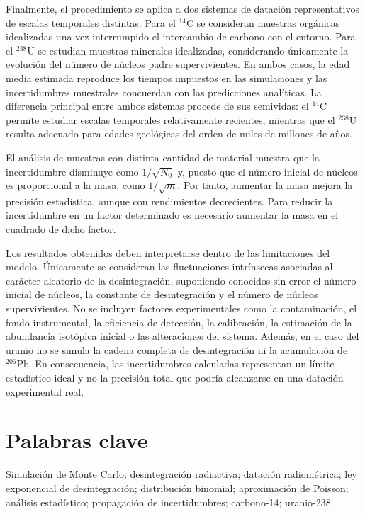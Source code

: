 \documentclass[12pt,a4paper]{article}
\begin{document}
Finalmente, el procedimiento se aplica a dos sistemas de datación representativos de escalas temporales distintas. Para el $^{14}\text{C}$ se consideran muestras orgánicas idealizadas una vez interrumpido el intercambio de carbono con el entorno. Para el $^{238}\text{U}$ se estudian muestras minerales idealizadas, considerando únicamente la evolución del número de núcleos padre supervivientes. En ambos casos, la edad media estimada reproduce los tiempos impuestos en las simulaciones y las incertidumbres muestrales concuerdan con las predicciones analíticas. La diferencia principal entre ambos sistemas procede de sus semividas: el $^{14}\text{C}$ permite estudiar escalas temporales relativamente recientes, mientras que el $^{238}\text{U}$ resulta adecuado para edades geológicas del orden de miles de millones de años.

El análisis de muestras con distinta cantidad de material muestra que la incertidumbre disminuye como $1/\sqrt{N_0}$ y, puesto que el número inicial de núcleos es proporcional a la masa, como $1/\sqrt{m}$. Por tanto, aumentar la masa mejora la precisión estadística, aunque con rendimientos decrecientes. Para reducir la incertidumbre en un factor determinado es necesario aumentar la masa en el cuadrado de dicho factor.

Los resultados obtenidos deben interpretarse dentro de las limitaciones del modelo. Únicamente se consideran las fluctuaciones intrínsecas asociadas al carácter aleatorio de la desintegración, suponiendo conocidos sin error el número inicial de núcleos, la constante de desintegración y el número de núcleos supervivientes. No se incluyen factores experimentales como la contaminación, el fondo instrumental, la eficiencia de detección, la calibración, la estimación de la abundancia isotópica inicial o las alteraciones del sistema. Además, en el caso del uranio no se simula la cadena completa de desintegración ni la acumulación de $^{206}\text{Pb}$. En consecuencia, las incertidumbres calculadas representan un límite estadístico ideal y no la precisión total que podría alcanzarse en una datación experimental real.

\section*{Palabras clave}

Simulación de Monte Carlo; desintegración radiactiva; datación radiométrica; ley exponencial de desintegración; distribución binomial; aproximación de Poisson; análisis estadístico; propagación de incertidumbres; carbono-14; uranio-238.
\end{document}
